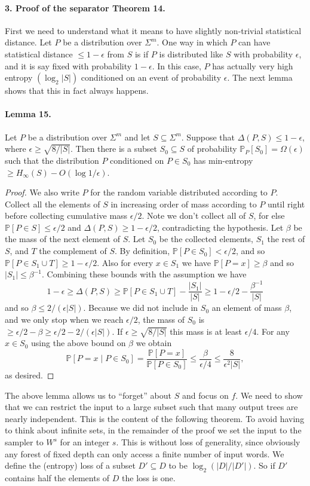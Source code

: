 \paragraph{3. Proof of the separator Theorem 14.}
First we need to understand what it means to have slightly non-trivial statistical distance. Let $P$ be a distribution over $\Sigma^m$. One way in which $P$ can have statistical distance $\leq1-\epsilon$ from $S$ is if $P$ is distributed like $S$ with probability $\epsilon$, and it is say fixed with probability $1-\epsilon$. In this case, $P$ has actually very high entropy $(\log_2|S|)$ conditioned on an event of probability $\epsilon$. The next lemma shows that this in fact always happens.
\paragraph{Lemma 15.}
Let $P$ be a distribution over $\Sigma^m$ and let $S\subseteq\Sigma^m$. Suppose that $\Delta(P,S)\leq1-\epsilon$, where $\epsilon\geq\sqrt{8/|S|}$. Then there is a subset $S_0\subseteq S$ of probability $\mathbb P_P[S_0]=\Omega(\epsilon)$ such that the distribution $P$ conditioned on $P\in S_0$ has min-entropy $\geq H_\infty(S)-O(\log1/\epsilon)$.
\begin{proof}
We also write $P$ for the random variable distributed according to $P$. Collect all the elements of $S$ in increasing order of mass according to $P$ until right before collecting cumulative mass $\epsilon/2$. Note we don't collect all of $S$, for else $\mathbb P[P\in S]\leq\epsilon/2$ and $\Delta(P,S)\geq1-\epsilon/2$, contradicting the hypothesis.
Let $\beta$ be the mass of the next element of $S$. Let $S_0$ be the collected elements, $S_1$ the rest of $S$, and $T$ the complement of $S$. By definition, $\mathbb P[P\in S_0]<\epsilon/2$, and so $\mathbb P[P\in S_1\cup T]\geq1-\epsilon/2$. Also for every $x\in S_1$ we have $\mathbb P[P=x]\geq\beta$ and so $|S_1|\leq\beta^{-1}$. Combining these bounds with the assumption we have
\[1-\epsilon\geq\Delta(P,S)\geq\mathbb P[P\in S_1\cup T]-\frac{|S_1|}{|S|}\geq1-\epsilon/2-\frac{\beta^{-1}}{|S|}\]
and so $\beta\leq2/(\epsilon|S|)$.
Because we did not include in $S_0$ an element of mass $\beta$, and we only stop when we reach $\epsilon/2$, the mass of $S_0$ is $\geq\epsilon/2-\beta\geq\epsilon/2-2/(\epsilon|S|)$. If $\epsilon\geq\sqrt{8/|S|}$ this mass is at least $\epsilon/4$.
For any $x\in S_0$ using the above bound on $\beta$ we obtain
\[\mathbb P[P=x\mid P\in S_0]=\frac{\mathbb P[P=x]}{\mathbb P[P\in S_0]}\leq\frac{\beta}{\epsilon/4}\leq\frac8{\epsilon^2|S|},\]
as desired.
\end{proof}
The above lemma allows us to ``forget'' about $S$ and focus on $f$. We need to show that we can restrict the input to a large subset such that many output trees are nearly independent. This is the content of the following theorem. To avoid having to think about infinite sets, in the remainder of the proof we set the input to the sampler to $W^s$ for an integer $s$. This is without loss of generality, since obviously any forest of fixed depth can only access a finite number of input words.
We define the (entropy) loss of a subset $D'\subseteq D$ to be $\log_2(|D|/|D'|)$. So if $D'$ contains half the elements of $D$ the loss is one.
